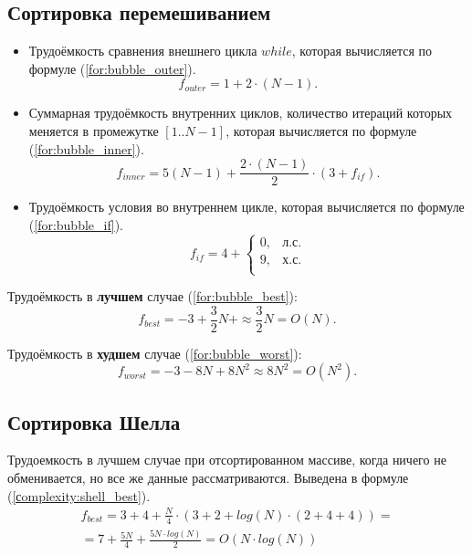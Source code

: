 \subsection{Сортировка перемешиванием}
\begin{itemize}
	\item Трудоёмкость сравнения внешнего цикла $while$, которая вычисляется по формуле (\ref{for:bubble_outer}).
	\begin{equation}
		\label{for:bubble_outer}
		f_{outer} = 1 + 2 \cdot (N - 1).
	\end{equation}
	\item Суммарная трудоёмкость внутренних циклов, количество итераций которых меняется в промежутке $[1..N-1]$, которая вычисляется по формуле (\ref{for:bubble_inner}).
	\begin{equation}
		\label{for:bubble_inner}
		f_{inner} = 5(N - 1) + \frac{2 \cdot (N - 1)}{2} \cdot (3 + f_{if}).
	\end{equation}
	\item Трудоёмкость условия во внутреннем цикле, которая вычисляется по формуле (\ref{for:bubble_if}).
	\begin{equation}
		\label{for:bubble_if}
		f_{if} = 4 + \begin{cases}
			0, & \text{л.с.}\\
			9, & \text{х.с.}\\
		\end{cases}
	\end{equation}
\end{itemize}

Трудоёмкость в \textbf{лучшем} случае (\ref{for:bubble_best}):
\begin{equation}
	\label{for:bubble_best}
	f_{best} = -3 + \frac{3}{2} N + \approx \frac{3}{2} N = O(N).
\end{equation}

Трудоёмкость в \textbf{худшем} случае (\ref{for:bubble_worst}):
\begin{equation}
	\label{for:bubble_worst}
	f_{worst} = -3 - 8N + 8N^2 \approx 8N^2 = O(N^2).
\end{equation}
\subsection{Сортировка Шелла}
Трудоемкость в лучшем случае при отсортированном массиве, когда ничего не обменивается, но все же данные рассматриваются. Выведена в \newline формуле (\ref{сomplexity:shell_best}).
\begin{equation}
	\label{сomplexity:shell_best}
	\begin{gathered}
		f_{best} = 3 + 4 + \frac{N}{4} \cdot (3 + 2 + log(N) \cdot (2 + 4 + 4)) = \\
		= 7 + \frac{5N}{4} + \frac{5N \cdot log(N)}{2} = O(N \cdot log(N))
	\end{gathered}
\end{equation}

